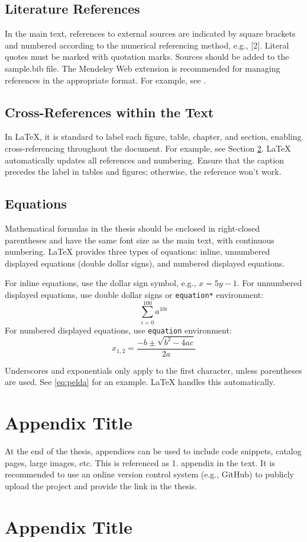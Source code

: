 \documentclass[12pt, a4paper, titlepage, onehalfspacing]{report}
\begin{document}
\section{Literature References}
In the main text, references to external sources are indicated by square brackets and numbered according to the numerical referencing method, e.g., [2]. Literal quotes must be marked with quotation marks.
Sources should be added to the sample.bib file. The Mendeley Web extension is recommended for managing references in the appropriate format. For example, see \cite{maurer-2016}.

\section{Cross-References within the Text} \label{sec:kereszthivatkozas}
In LaTeX, it is standard to label each figure, table, chapter, and section, enabling cross-referencing throughout the document. For example, see Section \ref{sec:kereszthivatkozas}. LaTeX automatically updates all references and numbering. Ensure that the caption precedes the label in tables and figures; otherwise, the reference won't work.

\section{Equations}
Mathematical formulas in the thesis should be enclosed in right-closed parentheses and have the same font size as the main text, with continuous numbering. LaTeX provides three types of equations: inline, unnumbered displayed equations (double dollar signs), and numbered displayed equations.

For inline equations, use the dollar sign symbol, e.g., $x=5y-1$. For unnumbered displayed equations, use double dollar signs or \texttt{equation*} environment:
\[
\sum_{i=0}^{100} a^{10i}
\]
For numbered displayed equations, use \texttt{equation} environment:
\begin{equation}
    x_{1,2} = \frac{-b \pm \sqrt{b^2-4ac}}{2a}
    \label{eq:pelda}
\end{equation}

Underscores and exponentials only apply to the first character, unless parentheses are used. See \eqref{eq:pelda} for an example. LaTeX handles this automatically.

\printbibliography %

\listoffigures %

\listoftables %

\appendix
\chapter{Appendix Title}
At the end of the thesis, appendices can be used to include code snippets, catalog pages, large images, etc. This is referenced as 1. appendix in the text. It is recommended to use an online version control system (e.g., GitHub) to publicly upload the project and provide the link in the thesis.
\chapter{Appendix Title}
\end{document}
